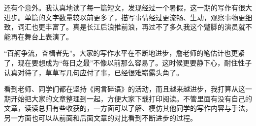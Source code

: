 还有个意外。我认真地读了每一篇短文，发现经过一个暑假，这一期的写作有很大进步。单篇的文字数量较以前更多了，描写事情经过更流畅、生动，观察事物更细致，词汇也更丰富了。真是长江后浪推前浪，再过不了多久我这个蹩脚的演员就不能再在舞台上表演了。

“百舸争流，奋楫者先”。大家的写作水平在不断地进步，詹老师的笔估计也更紧了，现在要想成为“每日之最”不像以前那么容易了。这时候更要静下心，耐住性子认真对待了，草草写几句应付了事，已经很难崭露头角了。

看到老师、同学们都在坚持《闲言碎语》的活动，而且越来越进步，我打算从这一期开始把大家的文章整理到一起，方便大家下载打印阅读。不管里面有没有自己的文章，读读总归有些收获的，一方面可以了解、模仿其他同学的写作内容与手法，另一方面也可以从前面和后面文章的对比看到不断进步的过程。